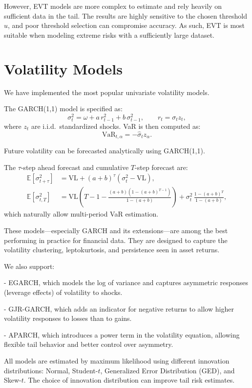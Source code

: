 \documentclass[12pt]{article}
\begin{document}
However, EVT models are more complex to estimate and rely heavily on sufficient data in the tail. The results are highly sensitive to the chosen threshold $u$, and poor threshold selection can compromise accuracy. As such, EVT is most suitable when modeling extreme risks with a sufficiently large dataset.


\section{Volatility Models}

We have implemented the most popular univariate volatility models.

The GARCH(1,1) model is specified as:
\[
  \sigma_t^2 = \omega + a\, r_{t-1}^2 + b\, \sigma_{t-1}^2, \qquad r_t = \sigma_t z_t,
\]
where \( z_t \) are i.i.d.\ standardized shocks. VaR is then computed as:
\[
  \text{VaR}_{t,\alpha} = -\hat{\sigma}_t z_\alpha.
\]

Future volatility can be forecasted analytically using GARCH(1,1).

The \( \tau \)-step ahead forecast and cumulative \( T \)-step forecast are:
\begin{align*}
  \mathbb{E}[\sigma_{t+\tau}^2] &= \mathrm{VL} + (a + b)^\tau(\sigma_t^2 - \mathrm{VL}),  \\  
  \mathbb{E}[\sigma_{t,T}^2] &= \mathrm{VL}\left(T - 1 - \frac{(a + b)(1 - (a + b)^{T - 1})}{1 - (a + b)}\right)
    + \sigma_t^2\, \frac{1 - (a + b)^T}{1 - (a + b)},
\end{align*}
which naturally allow multi-period VaR estimation.

These models—especially GARCH and its extensions—are among the best performing in practice for financial data. They are designed to capture the volatility clustering, leptokurtosis, and persistence seen in asset returns.

We also support:

- EGARCH, which models the log of variance and captures asymmetric responses (leverage effects) of volatility to shocks.

- GJR-GARCH, which adds an indicator for negative returns to allow higher volatility responses to losses than to gains.

- APARCH, which introduces a power term in the volatility equation, allowing flexible tail behavior and better control over asymmetry.

All models are estimated by maximum likelihood using different innovation distributions: Normal, Student-\( t \), Generalized Error Distribution (GED), and Skew-\( t \). The choice of innovation distribution can improve tail risk estimates.
\end{document}
